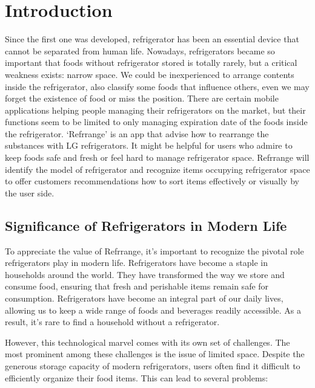 \documentclass[conference]{IEEEtran}
\begin{document}
\section{Introduction}
Since the first one was developed, refrigerator has been an essential device that cannot be separated from human life. Nowadays, refrigerators became so important that foods without refrigerator stored is totally rarely, but a critical weakness exists: narrow space.
We could be inexperienced to arrange contents inside the refrigerator, also classify some foods that influence others, even we may forget the existence of food or miss the position.
There are certain mobile applications helping people managing their refrigerators on the market, but their functions seem to be limited to only managing expiration date of the foods inside the refrigerator. 
‘Refrrange’ is an app that advise how to rearrange the substances with LG refrigerators. It might be helpful for users who admire to keep foods safe and fresh or feel hard to manage refrigerator space. Refrrange will identify the model of refrigerator and recognize items occupying refrigerator space to offer customers recommendations how to sort items effectively or visually by the user side.



\subsection{Significance of Refrigerators in Modern Life}
    
To appreciate the value of Refrrange, it's important to recognize the pivotal role refrigerators play in modern life. Refrigerators have become a staple in households around the world. They have transformed the way we store and consume food, ensuring that fresh and perishable items remain safe for consumption. Refrigerators have become an integral part of our daily lives, allowing us to keep a wide range of foods and beverages readily accessible. As a result, it's rare to find a household without a refrigerator.

However, this technological marvel comes with its own set of challenges. The most prominent among these challenges is the issue of limited space. Despite the generous storage capacity of modern refrigerators, users often find it difficult to efficiently organize their food items. This can lead to several problems:
\end{document}
